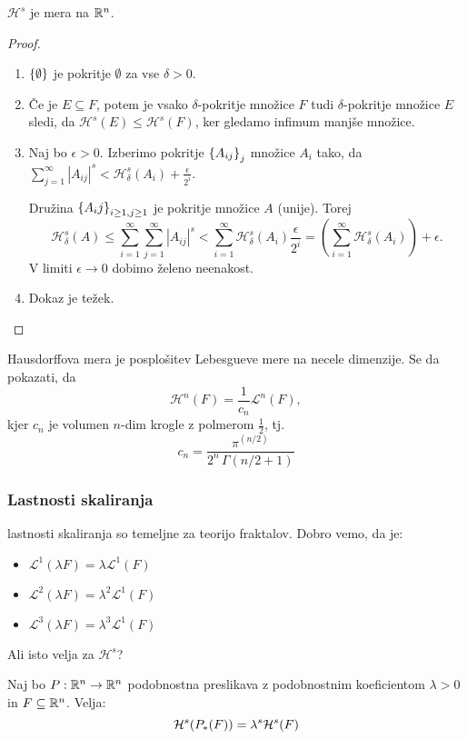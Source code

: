 \begin{trditev}
    \(\mathcal{H}^s\) je mera na \(\mathbb{R}^n\).
\end{trditev}
\begin{proof}
    \ 
    \begin{enumerate}
        \item \(\left\{\emptyset\right\}\) je pokritje \(\emptyset\) za vse \(\delta > 0\).
        \item Če je \(E \subseteq F\), potem je vsako \(\delta\)-pokritje množice \(F\) tudi \(\delta\)-pokritje množice \(E\) sledi, da \(\mathcal{H}^s(E) \leq \mathcal{H}^s(F)\), ker gledamo infimum manjše množice.
        \item Naj bo \(\epsilon > 0\). Izberimo pokritje \(\left\{A_{ij}\right\}_j\) množice \(A_i\) tako, da \(\sum_{j=1}^{\infty} |A_{ij}|^s < \mathcal{H}^s_\delta(A_i) + \frac{\epsilon}{2^i}\). 
        
        Družina \(\left\{A_ij\right\}_{i \geq 1, j \geq 1}\) je pokritje množice \(A\) (unije). Torej 
        \[\mathcal{H}^s_\delta(A) \leq \sum_{i=1}^{\infty} \sum_{j=1}^{\infty} |A_{ij}|^s < \sum_{i=1}^{\infty} \mathcal{H}^s_\delta (A_i) \frac{\epsilon}{2^i} = \left(\sum_{i=1}^{\infty} \mathcal{H}^s_\delta (A_i)\right) + \epsilon.\]
        V limiti \(\epsilon \to 0\) dobimo želeno neenakost. 
        \item Dokaz je težek. \qedhere
    \end{enumerate}
\end{proof}

\begin{opomba}
    Hausdorffova mera je posplošitev Lebesgueve mere na necele dimenzije. Se da pokazati, da 
    \[\mathcal{H}^n(F) = \frac{1}{c_n} \mathcal{L}^n(F),\]
    kjer \(c_n\) je volumen \(n\)-dim krogle z polmerom \(\frac{1}{2}\), tj. 
    \[c_n = \frac{\pi^{(n/2)}}{2^n \, \Gamma(n/2 + 1)}\]
\end{opomba}

\subsubsection*{Lastnosti skaliranja}
lastnosti skaliranja so temeljne za teorijo fraktalov.
Dobro vemo, da je:
\begin{itemize}
    \item \(\mathcal{L}^1(\lambda F) = \lambda \mathcal{L}^1(F)\)
    \item \(\mathcal{L}^2(\lambda F) = \lambda^2 \mathcal{L}^1(F)\)
    \item \(\mathcal{L}^3(\lambda F) = \lambda^3 \mathcal{L}^1(F)\)
\end{itemize}
Ali isto velja za \(\mathcal{H}^s\)?
\begin{trditev}
    Naj bo \(P: \mathbb{R}^n \to \mathbb{R}^n\) podobnostna preslikava z podobnostnim koeficientom \(\lambda > 0\) in \(F \subseteq \mathbb{R}^n\). Velja:
    \[\mathcal{H}^s(P_{*}(F)) = \lambda^s \mathcal{H}^s(F)\]
\end{trditev}

